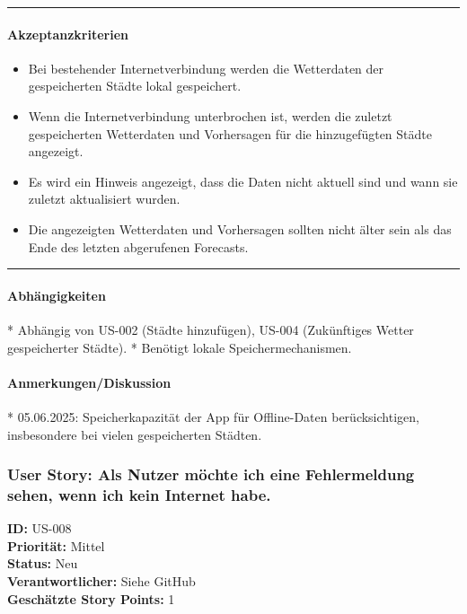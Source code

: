 \documentclass{article}
\begin{document}
\vspace{0.5em}
\hrule

\paragraph{Akzeptanzkriterien}
\begin{itemize}
    \item Bei bestehender Internetverbindung werden die Wetterdaten der gespeicherten Städte lokal gespeichert.
    \item Wenn die Internetverbindung unterbrochen ist, werden die zuletzt gespeicherten Wetterdaten und Vorhersagen für die hinzugefügten Städte angezeigt.
    \item Es wird ein Hinweis angezeigt, dass die Daten nicht aktuell sind und wann sie zuletzt aktualisiert wurden.
    \item Die angezeigten Wetterdaten und Vorhersagen sollten nicht älter sein als das Ende des letzten abgerufenen Forecasts.
\end{itemize}

\vspace{0.5em}
\hrule

\paragraph{Abhängigkeiten}
* Abhängig von US-002 (Städte hinzufügen), US-004 (Zukünftiges Wetter gespeicherter Städte).
* Benötigt lokale Speichermechanismen.

\paragraph{Anmerkungen/Diskussion}
* 05.06.2025: Speicherkapazität der App für Offline-Daten berücksichtigen, insbesondere bei vielen gespeicherten Städten.

\clearpage

\subsubsection{User Story: Als Nutzer möchte ich eine Fehlermeldung sehen, wenn ich kein Internet habe.}
\textcolor{storyblue}{\textbf{ID:}} US-008 \\
\textcolor{storyblue}{\textbf{Priorität:}} Mittel \\
\textcolor{storyblue}{\textbf{Status:}} Neu \\
\textcolor{storyblue}{\textbf{Verantwortlicher:}} Siehe GitHub \\
\textcolor{storyblue}{\textbf{Geschätzte Story Points:}} 1
\end{document}
